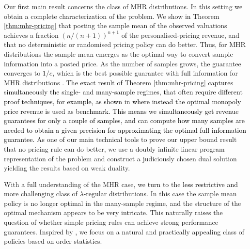 \documentclass[11pt]{article}
\newcommand{\brown}[1]{\textcolor{black}{#1}}
\begin{document}
Our first main result concerns the class of MHR distributions.
In this setting we obtain a complete characterization of the problem.
We show in Theorem \ref{thm:mhr-pricing} that posting the sample mean of the observed valuations achieves a fraction $(n/(n+1))^{n+1}$ of the personalised-pricing revenue, and that no deterministic or randomised pricing policy can do better.
Thus, for MHR distributions the sample mean emerges as the optimal way to convert sample information into a posted price. As the number of samples grows, the guarantee converges to $1/e$, which is the best possible guarantee with full information for MHR distributions \cite[Lemma 9]{cole2017applications}.
\brown{The exact result of Theorem \ref{thm:mhr-pricing} captures simultaneously the single- and many-sample regimes, that often require different proof techniques, for example, as shown in \cite{dhangwatnotai2010revenue,babaioff2018two,daskalakis2020more,allouah2022pricing} where instead the optimal monopoly price revenue is used as benchmark. This means we simultaneously get revenue guarantees for only a couple of samples, and can compute how many samples are needed to obtain a given precision for approximating the optimal full information guarantee.} As one of our main technical tools to prove our upper bound result that no pricing rule can do better, we use a doubly infinite linear program representation of the problem and construct a judiciously chosen dual solution yielding the results based on weak duality. 

With a full understanding of the MHR case, we turn to the \brown{less restrictive} and more challenging class of $\lambda$-regular distributions. {In this case the sample mean policy is no longer optimal in the many-sample regime, and the structure of the optimal mechanism appears to be very intricate. This naturally raises the question of whether simple pricing rules can achieve strong performance guarantees.}
Inspired by \cite{allouah2022pricing}, we focus on a natural and practically appealing class of policies based on order statistics.
\end{document}
